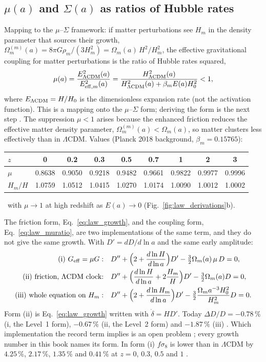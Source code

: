\subsection{$\mu(a)$ and $\Sigma(a)$ as ratios of Hubble rates}
Mapping to the $\mu$--$\Sigma$ framework: if matter perturbations see $H_m$ in the density parameter that sources their growth,
$\Omega_m^{(m)}(a)=8\pi G\rho_m/(3H_m^2)=\Omega_m(a)\,H^2/H_m^2$, the effective gravitational coupling for matter perturbations is the ratio of Hubble rates
squared,
\begin{equation}
\mu(a)=\frac{E^2_{\Lambda{\rm CDM}}(a)}{E^2_{{\rm eff},m}(a)}=\frac{H^2_{\Lambda{\rm CDM}}(a)}{H^2_{\Lambda{\rm CDM}}(a)+\beta_mE(a)H_0^2}<1, \label{eq:law_muratio}
\end{equation}
where $E_{\Lambda{\rm CDM}}=H/H_0$ is the dimensionless expansion rate (not the activation function). This is a mapping onto the $\mu$--$\Sigma$ form; deriving the form is the next step \interp. The suppression $\mu<1$ arises because the enhanced friction reduces the effective matter density parameter,
$\Omega_m^{(m)}(a)<\Omega_m(a)$, so matter clusters less effectively than in $\Lambda$CDM. Values (Planck 2018 background, $\beta_m=0.15765$):

\begin{center}
\begin{tabular}{lcccccccc}\hline
$z$ & 0 & 0.2 & 0.3 & 0.5 & 0.7 & 1 & 2 & 3\\\hline
$\mu$ & 0.8638 & 0.9050 & 0.9218 & 0.9482 & 0.9661 & 0.9822 & 0.9977 & 0.9996\\
$H_m/H$ & 1.0759 & 1.0512 & 1.0415 & 1.0270 & 1.0174 & 1.0090 & 1.0012 & 1.0002\\\hline
\end{tabular}
\end{center}
\calc\ with $\mu\to1$ at high redshift as $E(a)\to0$ (Fig.~\ref{fig:law_derivations}b).

The friction form, Eq.~\eqref{eq:law_growth}, and the coupling form, Eq.~\eqref{eq:law_muratio}, are two implementations of the same term, and they do not give
the same growth. With $D'=dD/d\ln a$ and the same early amplitude:
\begin{align}
\text{(i) }G_{\rm eff}=\mu G:&\quad D''+\Big(2+\frac{d\ln H}{d\ln a}\Big)D'-\tfrac32\Omega_m(a)\,\mu\,D=0,\\
\text{(ii) friction, }\Lambda\text{CDM clock:}&\quad D''+\Big(\frac{d\ln H}{d\ln a}+2\frac{H_m}{H}\Big)D'-\tfrac32\Omega_m(a)D=0,\\
\text{(iii) whole equation on }H_m:&\quad D''+\Big(2+\frac{d\ln H_m}{d\ln a}\Big)D'-\tfrac32\frac{\Omega_ma^{-3}H_0^2}{H_m^2}D=0 .
\end{align}
Form (ii) is Eq.~\eqref{eq:law_growth} written with $\dot\delta=HD'$. Today $\Delta D/D=-0.78\,\%$ (i, the Level~1 form), $-0.67\,\%$ (ii, the Level~2 form) and
$-1.87\,\%$ (iii) \calc. Which implementation the record term implies is an open problem \openprob; every growth number in this book names its form. In form (i)
$f\sigma_8$ is lower than in $\Lambda$CDM by $4.25\,\%$, $2.17\,\%$, $1.35\,\%$ and $0.41\,\%$ at $z=0$, $0.3$, $0.5$ and $1$ \calc.

